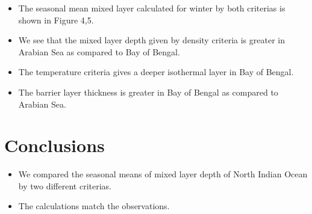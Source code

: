 \documentclass[20pt]{article}
\begin{document}
\begin{itemize}
    \item The seasonal mean mixed layer calculated for winter by both criterias is shown in Figure 4,5.
    \item We see that the mixed layer depth given by density criteria is greater in Arabian Sea as compared to Bay of Bengal.
    \item The temperature criteria gives a deeper isothermal layer in Bay of Bengal.
    \item The barrier layer thickness is greater in Bay of Bengal as compared to Arabian Sea.
\end{itemize}

\section*{Conclusions}

\begin{itemize}
    \item We compared the seasonal means of mixed layer depth of North Indian Ocean by two different criterias.
    \item The calculations match the observations.
\end{itemize}
\end{document}
